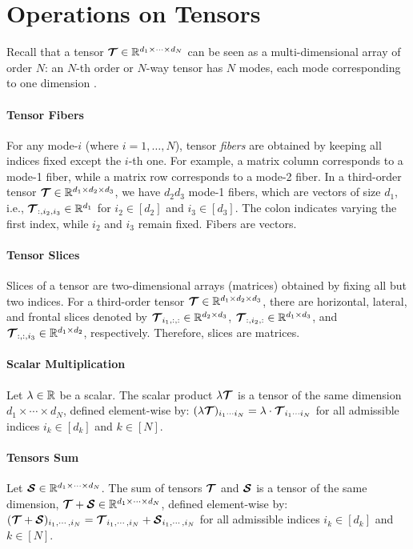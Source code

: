 \section{Operations on Tensors}\label{chapter:operations}
Recall that a tensor $\bm{\mathcal{T}} \in \mathbb{R}^{d_1 \times \cdots \times d_N}$ can be seen as a multi-dimensional array of order $N$: an $N$-th order or $N$-way tensor has $N$ modes, each mode corresponding to one dimension \citep{kolda2009tensor}.
\paragraph{Tensor Fibers} For any mode-$i$ (where $i = 1, \dots, N$), tensor \textit{fibers} are obtained by keeping all indices fixed except the $i$-th one. For example, a matrix column corresponds to a mode-1 fiber, while a matrix row corresponds to a mode-2 fiber. In a third-order tensor $\bm{\mathcal{T}} \in \mathbb{R}^{d_1 \times d_2 \times d_3}$, we have $d_2d_3$ mode-1 fibers, which are vectors of size $d_1$, i.e., $\bm{\mathcal{T}}_{:,i_2,i_3} \in \mathbb{R}^{d_1}$ for $i_2 \in [d_2]$ and $i_3 \in [d_3]$. The colon indicates varying the first index, while $i_2$ and $i_3$ remain fixed. Fibers are vectors.
\paragraph{Tensor Slices} Slices of a tensor are two-dimensional arrays (matrices) obtained by fixing all but two indices. For a third-order tensor $\bm{\mathcal{T}} \in \mathbb{R}^{d_1 \times d_2 \times d_3}$, there are horizontal, lateral, and frontal slices denoted by $\bm{\mathcal{T}}_{i_1,:,:} \in \mathbb{R}^{d_2 \times d_3}$, $\bm{\mathcal{T}}_{:,i_2,:} \in \mathbb{R}^{d_1 \times d_3}$, and $\bm{\mathcal{T}}_{:,:,i_3} \in \mathbb{R}^{d_1 \times d_2}$, respectively. Therefore, slices are matrices.
\paragraph{Scalar Multiplication} 
Let $\lambda \in \mathbb{R}$ be a scalar. The scalar product $\lambda\bm{\mathcal{T}}$ 
 is a tensor of the same dimension $d_1 \times \cdots \times d_N$, defined element-wise by:
$
    (\lambda\bm{\mathcal{T}})_{i_1 \cdots i_N} = \lambda \cdot \bm{\mathcal{T}}_{i_1 \cdots i_N}$
for all admissible indices $i_k\in[d_k]$ and $k\in[N]$.
\paragraph{Tensors Sum} Let $\bm{\mathcal{S}}\in\mathbb{R}^{d_1\times\cdots\times d_N}$. The sum of tensors $\bm{\mathcal{T}}$ and $\bm{\mathcal{S}}$ is a tensor of the same dimension, $\bm{\mathcal{T}}+\bm{\mathcal{S}}\in\mathbb{R}^{d_1\times\cdots\times d_N}$, defined element-wise by: $(\bm{\mathcal{T}}+\bm{\mathcal{S}})_{i_1,\cdots,i_N} = \bm{\mathcal{T}}_{i_1,\cdots,i_N} + \bm{\mathcal{S}}_{i_1,\cdots,i_N}$ for all admissible indices $i_k\in[d_k]$ and $k\in[N]$.
